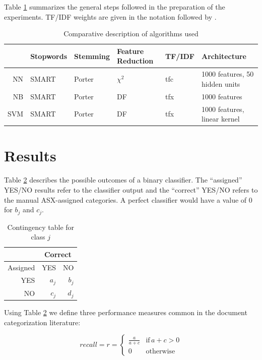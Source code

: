 \documentclass[a4paper,twocolumn]{article}
\begin{document}
Table \ref{algos} summarizes the general steps followed in the preparation of the experiments.  TF/IDF weights are given in the notation followed by \cite{salton:88}.

\begin{table}
\begin{tabularx}{\linewidth}{|r|l|l|l|l|X|}
\hline
& Stopwords & Stemming & Feature Reduction & TF/IDF & Architecture\\
\hline
NN & SMART & Porter & $\chi^2$ & tfc & 1000 features, 50 hidden units \\
\hline
NB & SMART & Porter & DF & tfx & 1000 features \\
\hline
SVM & SMART & Porter & DF & tfx & 1000 features, linear kernel \\

\hline
\end{tabularx}
\caption{Comparative description of algorithms used}
\label{algos}
\end{table}


\section{Results}
\label{results}


Table \ref{contingency} describes the possible outcomes of a binary classifier.  The ``assigned'' YES/NO results refer to the classifier output and the ``correct'' YES/NO refers to the manual ASX-assigned categories. A perfect classifier would have a value of 0 for $b_j$ and $c_j$.

\begin{table}
\begin{tabular}{|r|r|r|}
\hline
& \multicolumn{2}{|c|}{Correct} \\
\hline
Assigned & YES & NO \\
\hline
YES & $a_j$ & $b_j$ \\
\hline
NO & $c_j$ & $d_j$ \\
\hline
\end{tabular}
\caption{Contingency table for class $j$}
\label{contingency}
\end{table}

Using Table \ref{contingency} we define three performance measures common in the document categorization literature:

\begin{displaymath}
recall = r = \left\{ \begin{array}{ll}
\frac{a}{a+c} & \textrm{if} \, a+c>0 \\
0                  & \textrm{otherwise}
\end{array} \right.
\end{displaymath}
\end{document}
